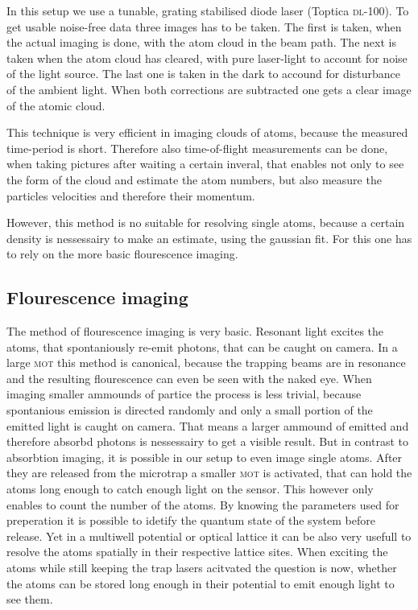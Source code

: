 In this setup we use a tunable, grating stabilised diode laser (Toptica \textsc{dl}-100). To get usable noise-free data three images has to be taken. The first is taken, when the actual imaging is done, with the atom cloud in the beam path. The next is taken when the atom cloud has cleared, with pure laser-light to account for noise of the light source. The last one is taken in the dark to accound for disturbance of the ambient light. When both corrections are subtracted one gets a clear image of the atomic cloud.

This technique is very efficient in imaging clouds of atoms, because the measured time-period is short. Therefore also time-of-flight measurements can be done, when taking pictures after waiting a certain inveral, that enables not only to see the form of the cloud and estimate the atom numbers, but also measure the particles velocities and therefore their momentum.

However, this method is no suitable for resolving single atoms, because a certain density is nessessairy to make an estimate, using the gaussian fit. For this one has to rely on the more basic flourescence imaging.

\subsection{Flourescence imaging}

The method of flourescence imaging is very basic\cite{timo}. Resonant light excites the atoms, that spontaniously re-emit photons, that can be caught on camera. In a large \textsc{mot} this method is canonical, because the trapping beams are in resonance and the resulting flourescence can even be seen with the naked eye. When imaging smaller ammounds of partice the process is less trivial, because spontanious emission is directed randomly and only a small portion of the emitted light is caught on camera. That means a larger ammound of emitted and therefore absorbd photons is nessessairy to get a visible result. But in contrast to absorbtion imaging, it is possible in our setup to even image single atoms. After they are released from the microtrap a smaller \textsc{mot} is activated, that can hold the atoms long enough to catch enough light on the sensor. This however only enables to count the number of the atoms. By knowing the parameters used for preperation it is possible to idetify the quantum state of the system before release. Yet in a multiwell potential or optical lattice it can be also very usefull to resolve the atoms spatially in their respective lattice sites. When exciting the atoms while still keeping the trap lasers acitvated the question is now, whether the atoms can be stored long enough in their potential to emit enough light to see them.

